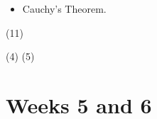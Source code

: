 \documentclass[1    0pt, answers]{exam} \renewcommand{\baselinestretch}{1.05}
\theoremstyle{plain}
\theoremstyle{definition}
\begin{document}
\begin{questions}
\begin{itemize}
\item Cauchy's Theorem.
\end{itemize}

\question (11)

\question (4)
\question (5)


\end{questions}

\section{Weeks 5 and 6}
\end{document}
